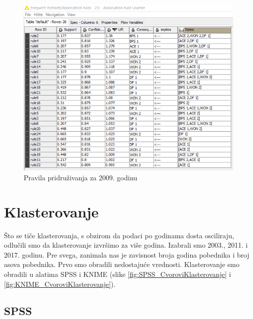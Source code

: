 \documentclass[a4paper]{article}
\begin{document}
\begin{figure}[H]
	\begin{center}
		\includegraphics[width=1\textwidth]{PravilaPridruzivanja/rule_learner_2009}
	\end{center}
	\caption{Pravila pridruživanja za 2009. godinu}
	\label{fig:rule_learner}
\end{figure}

\section{Klasterovanje}

Što se tiče klasterovanja, s obzirom da podaci po godinama dosta osciliraju, odlučili smo da klasterovanje izvršimo za više godina. Izabrali smo 2003., 2011. i 2017. godinu. Pre svega, zanimala nas je zavisnost broja godina pobednika i broj asova pobednika. Prvo smo obradili nedostajuće vrednosti. Klasterovanje smo obradili u alatima SPSS i KNIME (slike \ref{fig:SPSS_CvoroviKlasterovanje} i \ref{fig:KNIME_CvoroviKlasterovanje}). 

\restoregeometry
\subsection{SPSS}
\end{document}
